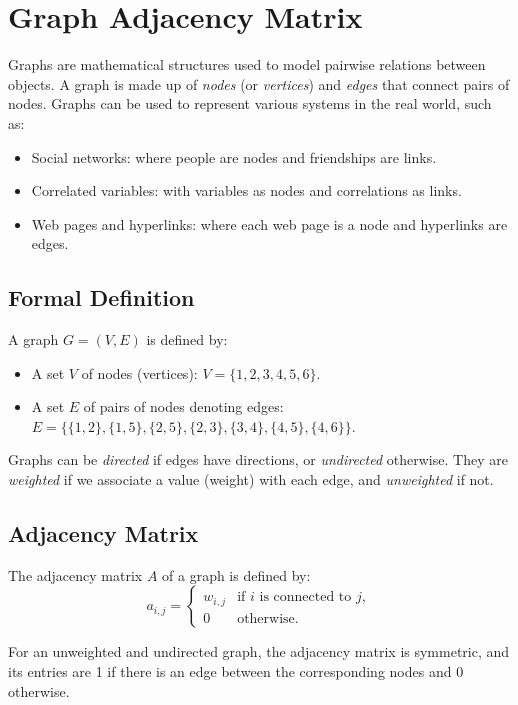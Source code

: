\section{Graph Adjacency Matrix}

Graphs are mathematical structures used to model pairwise relations between objects. A graph is made up of \textit{nodes} (or \textit{vertices}) and \textit{edges} that connect pairs of nodes. Graphs can be used to represent various systems in the real world, such as:

\begin{itemize}
  \item Social networks: where people are nodes and friendships are links.
  \item Correlated variables: with variables as nodes and correlations as links.
  \item Web pages and hyperlinks: where each web page is a node and hyperlinks are edges.
\end{itemize}

\subsection*{Formal Definition}
A graph \( G = (V, E) \) is defined by:
\begin{itemize}
  \item A set \( V \) of nodes (vertices): \( V = \{1,2,3,4,5,6\} \).
  \item A set \( E \) of pairs of nodes denoting edges: \( E = \{\{1,2\}, \{1,5\}, \{2,5\}, \{2,3\}, \{3,4\}, \{4,5\}, \{4,6\}\} \).
\end{itemize}

Graphs can be \textit{directed} if edges have directions, or \textit{undirected} otherwise. They are \textit{weighted} if we associate a value (weight) with each edge, and \textit{unweighted} if not.

\subsection*{Adjacency Matrix}
The adjacency matrix \( A \) of a graph is defined by:
\[ a_{i,j} = \begin{cases} 
w_{i,j} & \text{if } i \text{ is connected to } j, \\
0 & \text{otherwise}.
\end{cases} \]

For an unweighted and undirected graph, the adjacency matrix is symmetric, and its entries are 1 if there is an edge between the corresponding nodes and 0 otherwise.

